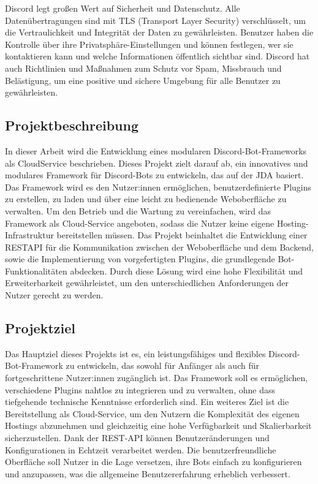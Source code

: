 Discord legt großen Wert auf Sicherheit und Datenschutz. Alle Datenübertragungen sind mit TLS (Transport Layer Security) verschlüsselt, um die Vertraulichkeit und Integrität der Daten zu gewährleisten. Benutzer haben die Kontrolle über ihre Privatsphäre-Einstellungen und können festlegen, wer sie kontaktieren kann und welche Informationen öffentlich sichtbar sind. Discord hat auch Richtlinien und Maßnahmen zum Schutz vor Spam, Missbrauch und Belästigung, um eine positive und sichere Umgebung für alle Benutzer zu gewährleisten.\autocite{discord-privacy}

\subsection{Projektbeschreibung}\label{projektbeschreibung}

In dieser Arbeit wird die Entwicklung eines modularen Discord-Bot-Frameworks als \gls{CloudService} beschrieben. Dieses Projekt zielt darauf ab, ein innovatives und modulares Framework für Discord-Bots zu entwickeln, das auf der \gls{JDA} \autocite{jda-github,jda-wiki} basiert. Das Framework wird es den Nutzer:innen ermöglichen, benutzerdefinierte Plugins zu erstellen, zu laden und über eine leicht zu bedienende Weboberfläche zu verwalten. Um den Betrieb und die Wartung zu vereinfachen, wird das Framework als Cloud-Service angeboten, sodass die Nutzer keine eigene Hosting-Infrastruktur bereitstellen müssen. Das Projekt beinhaltet die Entwicklung einer \gls{RESTAPI} für die Kommunikation zwischen der Weboberfläche und dem Backend, sowie die Implementierung von vorgefertigten Plugins, die grundlegende Bot-Funktionalitäten abdecken. Durch diese Lösung wird eine hohe Flexibilität und Erweiterbarkeit gewährleistet, um den unterschiedlichen Anforderungen der Nutzer gerecht zu werden.

\subsection{Projektziel}\label{projektziel}

Das Hauptziel dieses Projekts ist es, ein leistungsfähiges und flexibles Discord-Bot-Framework zu entwickeln, das sowohl für Anfänger als auch für fortgeschrittene Nutzer:innen zugänglich ist. Das Framework soll es ermöglichen, verschiedene Plugins nahtlos zu integrieren und zu verwalten, ohne dass tiefgehende technische Kenntnisse erforderlich sind. Ein weiteres Ziel ist die Bereitstellung als Cloud-Service, um den Nutzern die Komplexität des eigenen Hostings abzunehmen und gleichzeitig eine hohe Verfügbarkeit und Skalierbarkeit sicherzustellen. Dank der REST-API können Benutzeränderungen und Konfigurationen in Echtzeit verarbeitet werden. Die benutzerfreundliche Oberfläche soll Nutzer in die Lage versetzen, ihre Bots einfach zu konfigurieren und anzupassen, was die allgemeine Benutzererfahrung erheblich verbessert.